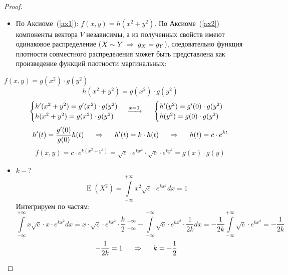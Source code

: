 \documentclass[12pt]{article} %
\theoremstyle{definition} %
\DeclareMathOperator{\E}{E}
\begin{document}
\begin{proof} \hspace{1cm}
    \begin{itemize}
        \item[ ] По Аксиоме~(\ref{ax1}): $f(x,y) = h(x^2+y^2)$. По Аксиоме~(\ref{ax2}) компоненты вектора $V$ независимы, а из полученных свойств имеют одинаковое распределение ($X \sim Y \hspace{0.1cm} \Rightarrow \hspace{0.1cm} g_X=g_Y$), следовательно функция плотности совместного распределения может быть представлена как произведение функций плотности маргинальных:
    \end{itemize}
    \centering $f(x,y)=g(x^2)\cdot g(y^2)$ \pagebreak
    \[
        h(x^2+y^2) = g(x^2) \cdot g(y^2)
    \]
    \[
        \begin{cases}
            h'(x^2+y^2) = g'(x^2) \cdot g(y^2)\\
            h(x^2+y^2) = g(x^2) \cdot g(y^2)
        \end{cases}
        \xrightarrow{x=0} \hspace{0.5cm}
        \begin{cases}
            h'(y^2) = g'(0) \cdot g(y^2)\\
            h(y^2) = g(0) \cdot g(y^2)
        \end{cases}
    \]
    \[
        h'(t) = \frac{g'(0)}{g(0)}h(t)
        \hspace{0.5cm} \Rightarrow \hspace{0.5cm}
        h'(t) = k \cdot h(t)
        \hspace{0.5cm} \Rightarrow \hspace{0.5cm}
        h(t)=c \cdot e^{kt}
    \]
    \[
        f(x,y) = c \cdot e^{k(x^2+y^2)} = \sqrt{c} \cdot e^{kx^2} \cdot \sqrt{c} \cdot e^{ky^2} = g(x) \cdot g(y)
    \]

    \begin{itemize}[label={$\bullet$}]
        \item $k - ?$
            \[
            \E(X^2) = \int\limits_{-\infty}^{+\infty} x^2 \sqrt{c} \cdot e^{kx^2} dx = 1
            \]
            Интегрируем по частям:
            \[
             \int\limits_{-\infty}^{+\infty} x \sqrt{c} \cdot x \cdot e^{kx^2} dx = x \cdot \sqrt{c} \cdot e^{kx^2} \cdot \frac{k}{2} \bigg\vert_{-\infty}^{+\infty} - \int\limits_{-\infty}^{+\infty} \sqrt{c} \cdot e^{kx^2} \cdot \frac{1}{2k} dx = - \frac{1}{2k} \int\limits_{-\infty}^{+\infty} \sqrt{c} \cdot e^{kx^2} = - \frac{1}{2k}
            \]
            \[
            - \frac{1}{2k} = 1  \hspace{0.5cm} \Rightarrow \hspace{0.5cm}
            k = - \frac{1}{2}
            \]


\end{itemize}
\end{proof}
\end{document}

